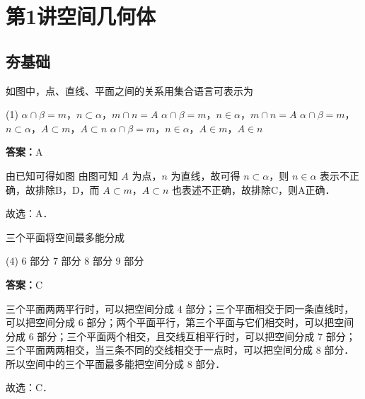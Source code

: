 \section{第1讲\quad 空间几何体}
\subsection{夯基础}

\begin{example}[\bkstar{1}{5}]
如图中，点、直线、平面之间的关系用集合语言可表示为
\begin{tasks}(1)
    \task $\alpha\cap\beta=m$，$n\subset\alpha$，$m\cap n=A$
    \task $\alpha\cap\beta=m$，$n\in\alpha$，$m\cap n=A$
    \task $\alpha\cap\beta=m$，$n\subset\alpha$，$A\subset m$，$A\subset n$
    \task $\alpha\cap\beta=m$，$n\in\alpha$，$A\in m$，$A\in n$
\end{tasks}
\end{example}
\begin{solution}
\textbf{答案：}A

由已知可得如图
由图可知 $A$ 为点，$n$ 为直线，故可得 $n\subset\alpha$，则 $n\in\alpha$ 表示不正确，故排除B，D，而 $A\subset m$，$A\subset n$ 也表述不正确，故排除C，则A正确．

故选：A．
\end{solution}

\vspace{2em}


\begin{example}[\bkstar{2}{5}]
三个平面将空间最多能分成
\begin{tasks}(4)
    \task $6$ 部分
    \task $7$ 部分
    \task $8$ 部分
    \task $9$ 部分
\end{tasks}
\end{example}
\begin{solution}
\textbf{答案：}C

三个平面两两平行时，可以把空间分成 $4$ 部分；三个平面相交于同一条直线时，可以把空间分成 $6$ 部分；两个平面平行，第三个平面与它们相交时，可以把空间分成 $6$ 部分；三个平面两个相交，且交线互相平行时，可以把空间分成 $7$ 部分；三个平面两两相交，当三条不同的交线相交于一点时，可以把空间分成 $8$ 部分．所以空间中的三个平面最多能把空间分成 $8$ 部分．

故选：C．
\end{solution}

